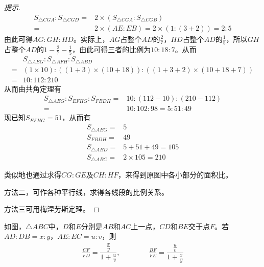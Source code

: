 \begin{proof}[提示]
  \begin{align*}
    S_{\triangle CGA}:S_{\triangle CGD} ={}& 2\times( S_{\triangle CGA}:S_{\triangle CGB} )\\
    ={}& 2\times( AE:EB ) = 2\times( 1 : (3+2))=2:5
  \end{align*}
  由此可得$AG:GH:HD$。实际上，$AG$占整个$AD$的$\frac27$，$HD$占整个$AD$的$\frac15$，所以$GH$占整个$AD$的$1-\frac27-\frac15$，由此可得三者的比例为$10:18:7$。从而
  \begin{align*}
    &S_{\triangle AEG} : S_{\triangle AFH} : S_{\triangle ABD}\\
    =&(1\times 10) : ((1+3)\times(10+18)) : ((1+3+2)\times(10+18+7))\\
    =&10 : 112 : 210
  \end{align*}
  从而由共角定理有
  \begin{align*}
    S_{\triangle AEG} : S_{EFHG} : S_{FBDH} ={}& 10 : (112-10) : (210-112)\\
    ={}& 10:102:98=5:51:49
  \end{align*}
  现已知$S_{EFHG}=51$，从而有
  \begin{align*}
    S_{\triangle AEG}={}&5\\
    S_{FBDH}         ={}&49\\
    S_{\triangle ABD}={}&5+51+49=105\\
    S_{\triangle ABC}={}&2\times 105=210
  \end{align*}

  类似地也通过求得$CG:GE$及$CH:HF$，来得到原图中各小部分的面积比。

  方法二，可作各种平行线，求得各线段的比例关系。

  方法三可用梅涅劳斯定理。
\end{proof}

\begin{theorem}
  如图，$\triangle ABC$中，$D$和$E$分别是$AB$和$AC$上一点，$CD$和$BE$交于点$F$。若$AD:DB=x:y$，$AE:EC=u:v$，则
  \begin{align*}
    \frac{CF}{FD} = \dfrac{\frac{x}{y}}{1+\frac{u}{v}},\qquad\qquad
    \frac{BF}{FE} = \dfrac{\frac{u}{v}}{1+\frac{x}{y}}
  \end{align*}
  \begin{center}
  \end{center}
\end{theorem}

